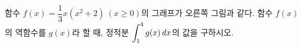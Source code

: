 \noindent\begin{minipage}[t]{0.58\linewidth}\vspace{0pt}\raggedright 함수 $f(x)=\dfrac{1}{3}x(x^2+2)\ (x\ge 0)$의 그래프가 오른쪽 그림과 같다. 함수 $f(x)$의 역함수를 $g(x)$라 할 때, 정적분 $\displaystyle\int_{1}^{4} g(x)\mkern3mu dx$의 값을 구하시오.\end{minipage}\hfill\begin{minipage}[t]{0.4\linewidth}\vspace{0pt}\centering \resizebox{\ifdim\width>\linewidth\linewidth\else\width\fi}{!}{}\end{minipage}\par
